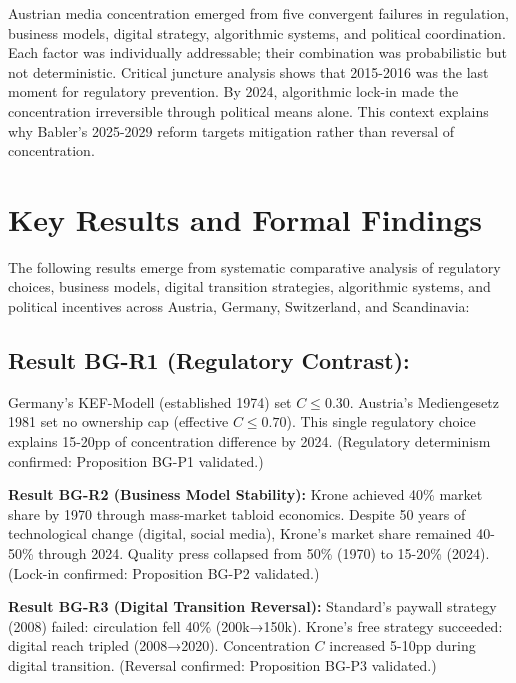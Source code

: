 {Austrian media concentration emerged from five convergent failures in regulation, business models,
digital strategy, algorithmic systems, and political coordination. Each factor was individually
addressable; their combination was probabilistic but not deterministic. Critical juncture analysis
shows that 2015-2016 was the last moment for regulatory prevention. By 2024, algorithmic lock-in
made the concentration irreversible through political means alone. This context explains why Babler's
2025-2029 reform targets mitigation rather than reversal of concentration.


\section{Key Results and Formal Findings}
\label{sec:bg-results}

The following results emerge from systematic comparative analysis of regulatory choices, business models,
digital transition strategies, algorithmic systems, and political incentives across Austria, Germany,
Switzerland, and Scandinavia:

\subsection*{Result BG-R1 (Regulatory Contrast):}
Germany's KEF-Modell (established 1974) set $C \leq 0.30$. Austria's Mediengesetz 1981 set no
ownership cap (effective $C \leq 0.70$). This single regulatory choice explains 15-20pp of
concentration difference by 2024. (Regulatory determinism confirmed: Proposition BG-P1 validated.)

\textbf{Result BG-R2 (Business Model Stability):}
Krone achieved 40\% market share by 1970 through mass-market tabloid economics. Despite 50 years of
technological change (digital, social media), Krone's market share remained 40-50\% through 2024.
Quality press collapsed from 50\% (1970) to 15-20\% (2024). (Lock-in confirmed: Proposition BG-P2 validated.)

\textbf{Result BG-R3 (Digital Transition Reversal):}
Standard's paywall strategy (2008) failed: circulation fell 40\% (200k→150k). Krone's free strategy
succeeded: digital reach tripled (2008→2020). Concentration $C$ increased 5-10pp during digital transition.
(Reversal confirmed: Proposition BG-P3 validated.)

}
